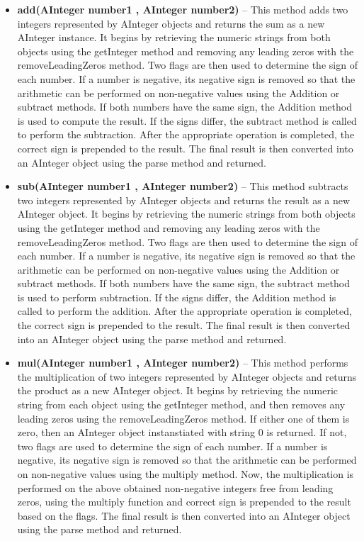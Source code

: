 \documentclass[a4paper,12pt]{article}
\begin{document}
\begin{itemize}
    \item \textbf{add(AInteger number1 , AInteger number2)} -- This method adds two integers represented by AInteger objects and returns the sum as a new AInteger instance. It begins by retrieving the numeric strings from both objects using the getInteger method and removing any leading zeros with the removeLeadingZeros method. Two flags are then used to determine the sign of each number. If a number is negative, its negative sign is removed so that the arithmetic can be performed on non-negative values using the Addition or subtract methods. If both numbers have the same sign, the Addition method is used to compute the result. If the signs differ, the subtract method is called to perform the subtraction. After the appropriate operation is completed, the correct sign is prepended to the result. The final result is then converted into an AInteger object using the parse method and returned.\\

    \item \textbf{sub(AInteger number1 , AInteger number2)} -- This method subtracts two integers represented by AInteger objects and returns the result as a new AInteger object. It begins by retrieving the numeric strings from both objects using the getInteger method and removing any leading zeros with the removeLeadingZeros method. Two flags are then used to determine the sign of each number. If a number is negative, its negative sign is removed so that the arithmetic can be performed on non-negative values using the Addition or subtract methods. If both numbers have the same sign, the subtract method is used to perform subtraction. If the signs differ, the Addition method is called to perform the addition. After the appropriate operation is completed, the correct sign is prepended to the result. The final result is then converted into an AInteger object using the parse method and returned.\\

    \item \textbf{mul(AInteger number1 , AInteger number2)} -- This method performs the multiplication of two integers represented by AInteger objects and returns the product as a new AInteger object. It begins by retrieving the numeric string from each object using the getInteger method, and then removes any leading zeros using the removeLeadingZeros method. If either one of them is zero, then an AInteger object instanstiated with string $0$ is returned. If not, two flags are used to determine the sign of each number. If a number is negative, its negative sign is removed so that the arithmetic can be performed on non-negative values using the multiply method. Now, the multiplication is performed on the above obtained non-negative integers free from leading zeros, using the multiply function and correct sign is prepended to the result based on the flags. The final result is then converted into an AInteger object using the parse method and returned.\\


\end{itemize}
\end{document}
